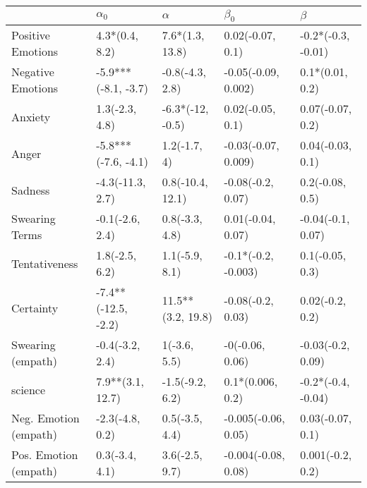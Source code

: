 \begin{tabular}{lllll}
\toprule
{} &           $\alpha_0$ &           $\alpha$ &            $\beta_0$ &             $\beta$ \\
\midrule
Positive Emotions     &       4.3*(0.4, 8.2) &    7.6*(1.3, 13.8) &     0.02(-0.07, 0.1) &  -0.2*(-0.3, -0.01) \\
Negative Emotions     &  -5.9***(-8.1, -3.7) &    -0.8(-4.3, 2.8) &  -0.05(-0.09, 0.002) &     0.1*(0.01, 0.2) \\
Anxiety               &       1.3(-2.3, 4.8) &   -6.3*(-12, -0.5) &     0.02(-0.05, 0.1) &    0.07(-0.07, 0.2) \\
Anger                 &  -5.8***(-7.6, -4.1) &       1.2(-1.7, 4) &  -0.03(-0.07, 0.009) &    0.04(-0.03, 0.1) \\
Sadness               &     -4.3(-11.3, 2.7) &   0.8(-10.4, 12.1) &    -0.08(-0.2, 0.07) &     0.2(-0.08, 0.5) \\
Swearing Terms        &      -0.1(-2.6, 2.4) &     0.8(-3.3, 4.8) &    0.01(-0.04, 0.07) &   -0.04(-0.1, 0.07) \\
Tentativeness         &       1.8(-2.5, 6.2) &     1.1(-5.9, 8.1) &  -0.1*(-0.2, -0.003) &     0.1(-0.05, 0.3) \\
Certainty             &  -7.4**(-12.5, -2.2) &  11.5**(3.2, 19.8) &    -0.08(-0.2, 0.03) &     0.02(-0.2, 0.2) \\
Swearing (empath)     &      -0.4(-3.2, 2.4) &       1(-3.6, 5.5) &      -0(-0.06, 0.06) &   -0.03(-0.2, 0.09) \\
science               &     7.9**(3.1, 12.7) &    -1.5(-9.2, 6.2) &     0.1*(0.006, 0.2) &  -0.2*(-0.4, -0.04) \\
Neg. Emotion (empath) &      -2.3(-4.8, 0.2) &     0.5(-3.5, 4.4) &  -0.005(-0.06, 0.05) &    0.03(-0.07, 0.1) \\
Pos. Emotion (empath) &       0.3(-3.4, 4.1) &     3.6(-2.5, 9.7) &  -0.004(-0.08, 0.08) &    0.001(-0.2, 0.2) \\
\bottomrule
\end{tabular}
